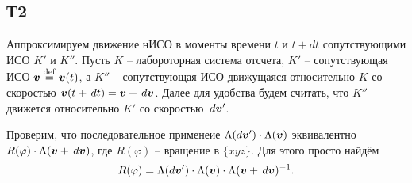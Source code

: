\subsection*{Т2}

Аппроксимируем движение нИСО в моменты времени $t$ и $t+dt$ сопутствующими ИСО $K'$ и $K''$. Пусть $K$ -- лабороторная система отсчета, $K'$ -- сопутствующая ИСО $\mbox{\boldmath $v$} \overset{\mathrm{def}}{=}  \mbox{\boldmath $v$}(t)$, а $K''$ -- сопутствующая ИСО движущаяся относительно $K$ со скоростью $\mbox{\boldmath $v$}(t + \, d t)  = \mbox{\boldmath $v$} + \, d \mbox{\boldmath $v$}$. Далее для удобства будем считать, что $K''$ движется относительно $K'$ со скоростью $\, d \mbox{\boldmath $v$}'$.

Проверим, что последовательное применеие $\Lambda(d \mbox{\boldmath $v$}') \cdot \Lambda(\mbox{\boldmath $v$})$ эквивалентно
$R(\varphi) \cdot \Lambda(\mbox{\boldmath $v$} + \, d \mbox{\boldmath $v$})$, где $R(\varphi)$ -- вращение в $\{xyz\}$. Для этого просто найдём 
\begin{equation*}
    R(\varphi) = \Lambda(d \mbox{\boldmath $v$}') \cdot \Lambda(\mbox{\boldmath $v$}) \cdot \Lambda(\mbox{\boldmath $v$} + \, d \mbox{\boldmath $v$})^{-1}.
\end{equation*}

